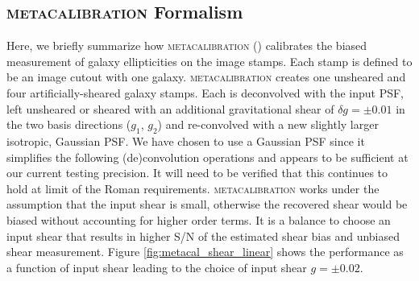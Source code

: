\documentclass[fleqn,usenatbib]{mnras}
\begin{document}
\subsection{\textsc{metacalibration} Formalism}
Here, we briefly summarize how \textsc{metacalibration} (\citealt{2017arXiv170202600H, 2017ApJ...841...24S}) calibrates the biased measurement of galaxy ellipticities on the image stamps. Each stamp is defined to be an image cutout with one galaxy. \textsc{metacalibration} creates one unsheared and four artificially-sheared galaxy stamps. Each is deconvolved with the input PSF, left unsheared or sheared with an additional gravitational shear of $\delta g=\pm 0.01$ in the two basis directions ($g_1$, $g_2$) and re-convolved with a new slightly larger isotropic, Gaussian PSF. We have chosen to use a Gaussian PSF since it simplifies the following (de)convolution operations and appears to be sufficient at our current testing precision. It will need to be verified that this continues to hold at limit of the Roman requirements. \textsc{metacalibration} works under the assumption that the input shear is small, otherwise the recovered shear would be biased without accounting for higher order terms. It is a balance to choose an input shear that results in higher S/N of the estimated shear bias  and unbiased shear measurement. Figure \ref{fig:metacal_shear_linear} shows the performance as a function of input shear leading to the choice of input shear $g=\pm 0.02$. 
\end{document}
